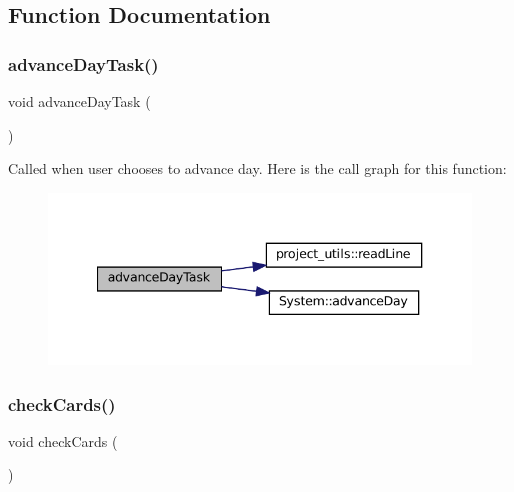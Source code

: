 \subsection{Function Documentation}
\mbox{\label{Train-System_8cpp_abddbad3ddf840e58faa0be003dea4bc1}} 
\subsubsection{\texorpdfstring{advance\+Day\+Task()}{advanceDayTask()}}
{\footnotesize\ttfamily void advance\+Day\+Task (\begin{DoxyParamCaption}{ }\end{DoxyParamCaption})}

Called when user chooses to advance day. Here is the call graph for this function\+:
\nopagebreak
\begin{figure}[H]
\begin{center}
\leavevmode
\includegraphics[width=340pt]{Train-System_8cpp_abddbad3ddf840e58faa0be003dea4bc1_cgraph}
\end{center}
\end{figure}
\mbox{\label{Train-System_8cpp_acc3a8510afc936d345b1330b79a4cf13}} 
\subsubsection{\texorpdfstring{check\+Cards()}{checkCards()}}
{\footnotesize\ttfamily void check\+Cards (\begin{DoxyParamCaption}{ }\end{DoxyParamCaption})}

